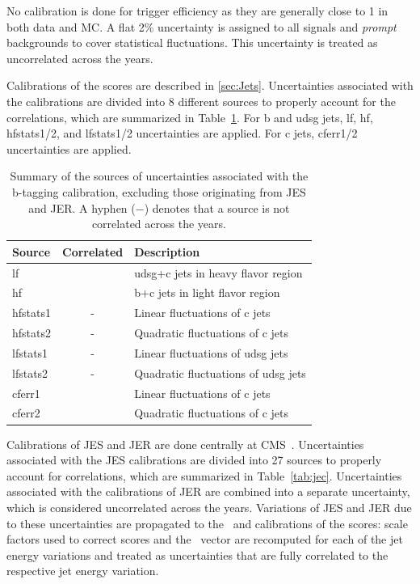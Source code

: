 No calibration is done for trigger efficiency as they are generally close to 1 in both data and \ac{MC}. A flat 2$\%$ uncertainty is assigned to all signals and \emph{prompt} backgrounds to cover statistical fluctuations. This uncertainty is treated as uncorrelated across the years.

Calibrations of the \DeepJ scores are described in \autoref{sec:Jets}. Uncertainties associated with the calibrations are divided into 8 different sources to properly account for the correlations, which are summarized in Table~\ref{tab:btagsys}. For b and udsg jets, lf, hf, hfstats1/2, and lfstats1/2 uncertainties are applied. For c jets, cferr1/2 uncertainties are applied. 

\begin{table}[!hbtp]
\sffamily
\centering
\caption{
Summary of the sources of uncertainties associated with the b-tagging calibration, excluding those originating from \ac{JES} and \ac{JER}. A hyphen ($-$) denotes that a source is not correlated across the years.
}
\begin{tabular}{lcl}
\toprule
Source & Correlated & Description\\
\midrule
lf			& \checkmark & udsg+c jets in heavy flavor region\\ %
hf			& \checkmark & b+c jets in light flavor region \\ %
hfstats1	& - 		 & Linear fluctuations of c jets\\
hfstats2	& -			 & Quadratic fluctuations of c jets \\
lfstats1	& -			 & Linear fluctuations of udsg jets \\
lfstats2	& -			 & Quadratic fluctuations of udsg jets \\
cferr1		& \checkmark & Linear fluctuations of c jets \\
cferr2		& \checkmark & Quadratic fluctuations of c jets \\
\bottomrule
\end{tabular}
\label{tab:btagsys}
\end{table}

Calibrations of \ac{JES} and \ac{JER} are done centrally at \ac{CMS}~\cite{CMS:2016lmd}. Uncertainties associated with the \ac{JES} calibrations are divided into 27 sources to properly account for correlations, which are summarized in Table~\ref{tab:jec}. Uncertainties associated with the calibrations of \ac{JER} are combined into a separate uncertainty, which is considered uncorrelated across the years. Variations of \ac{JES} and \ac{JER} due to these uncertainties are propagated to the \MET~and calibrations of the \DeepJ scores: scale factors used to correct \DeepJ scores and the \MET~vector are recomputed for each of the jet energy variations and treated as uncertainties that are fully correlated to the respective jet energy variation. 

